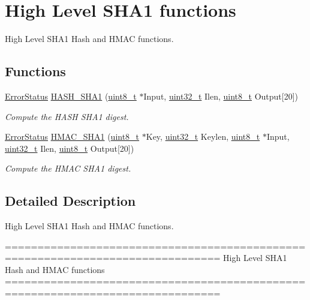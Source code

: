 \hypertarget{group___h_a_s_h___group6}{\section{High Level S\-H\-A1 functions}
\label{group___h_a_s_h___group6}
}


High Level S\-H\-A1 Hash and H\-M\-A\-C functions.  


\subsection*{Functions}
\begin{DoxyCompactItemize}
\item 
\hyperlink{group___exported__types_ga8333b96c67f83cba354b3407fcbb6ee8}{Error\-Status} \hyperlink{group___h_a_s_h___group6_ga2728c02c36de6d800e1ede56ea7789cb}{H\-A\-S\-H\-\_\-\-S\-H\-A1} (\hyperlink{stdint_8h_aba7bc1797add20fe3efdf37ced1182c5}{uint8\-\_\-t} $\ast$Input, \hyperlink{stdint_8h_a435d1572bf3f880d55459d9805097f62}{uint32\-\_\-t} Ilen, \hyperlink{stdint_8h_aba7bc1797add20fe3efdf37ced1182c5}{uint8\-\_\-t} Output\mbox{[}20\mbox{]})
\begin{DoxyCompactList}\small\item\em Compute the H\-A\-S\-H S\-H\-A1 digest. \end{DoxyCompactList}\item 
\hyperlink{group___exported__types_ga8333b96c67f83cba354b3407fcbb6ee8}{Error\-Status} \hyperlink{group___h_a_s_h___group6_ga2e38e900ca7838c1cea17cef19953a5e}{H\-M\-A\-C\-\_\-\-S\-H\-A1} (\hyperlink{stdint_8h_aba7bc1797add20fe3efdf37ced1182c5}{uint8\-\_\-t} $\ast$Key, \hyperlink{stdint_8h_a435d1572bf3f880d55459d9805097f62}{uint32\-\_\-t} Keylen, \hyperlink{stdint_8h_aba7bc1797add20fe3efdf37ced1182c5}{uint8\-\_\-t} $\ast$Input, \hyperlink{stdint_8h_a435d1572bf3f880d55459d9805097f62}{uint32\-\_\-t} Ilen, \hyperlink{stdint_8h_aba7bc1797add20fe3efdf37ced1182c5}{uint8\-\_\-t} Output\mbox{[}20\mbox{]})
\begin{DoxyCompactList}\small\item\em Compute the H\-M\-A\-C S\-H\-A1 digest. \end{DoxyCompactList}\end{DoxyCompactItemize}


\subsection{Detailed Description}
High Level S\-H\-A1 Hash and H\-M\-A\-C functions. \begin{DoxyVerb} ===============================================================================
                          High Level SHA1 Hash and HMAC functions
 ===============================================================================\end{DoxyVerb}
 

